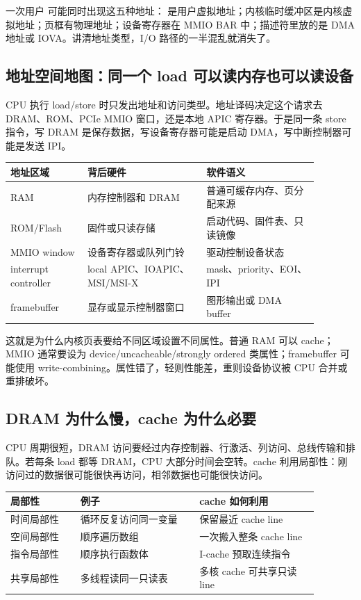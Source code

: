 一次用户  可能同时出现这五种地址： 是用户虚拟地址；内核临时缓冲区是内核虚拟地址；页框有物理地址；设备寄存器在 MMIO BAR 中；描述符里放的是 DMA 地址或 IOVA。讲清地址类型，I/O 路径的一半混乱就消失了。

\subsection{地址空间地图：同一个 load 可以读内存也可以读设备}

CPU 执行 load/store 时只发出地址和访问类型。地址译码决定这个请求去 DRAM、ROM、PCIe MMIO 窗口，还是本地 APIC 寄存器。于是同一条 store 指令，写 DRAM 是保存数据，写设备寄存器可能是启动 DMA，写中断控制器可能是发送 IPI。

\begin{longtable}{p{0.22\linewidth}p{0.34\linewidth}p{0.32\linewidth}}
\toprule
地址区域 & 背后硬件 & 软件语义 \\
\midrule
RAM & 内存控制器和 DRAM & 普通可缓存内存、页分配来源 \\
ROM/Flash & 固件或只读存储 & 启动代码、固件表、只读镜像 \\
MMIO window & 设备寄存器或队列门铃 & 驱动控制设备状态 \\
interrupt controller & local APIC、IOAPIC、MSI/MSI-X & mask、priority、EOI、IPI \\
framebuffer & 显存或显示控制器窗口 & 图形输出或 DMA buffer \\
\bottomrule
\end{longtable}

这就是为什么内核页表要给不同区域设置不同属性。普通 RAM 可以 cache；MMIO 通常要设为 device/uncacheable/strongly ordered 类属性；framebuffer 可能使用 write-combining。属性错了，轻则性能差，重则设备协议被 CPU 合并或重排破坏。

\subsection{DRAM 为什么慢，cache 为什么必要}

CPU 周期很短，DRAM 访问要经过内存控制器、行激活、列访问、总线传输和排队。若每条 load 都等 DRAM，CPU 大部分时间会空转。cache 利用局部性：刚访问过的数据很可能很快再访问，相邻数据也可能很快访问。

\begin{longtable}{p{0.2\linewidth}p{0.34\linewidth}p{0.34\linewidth}}
\toprule
局部性 & 例子 & cache 如何利用 \\
\midrule
时间局部性 & 循环反复访问同一变量 & 保留最近 cache line \\
空间局部性 & 顺序遍历数组 & 一次搬入整条 cache line \\
指令局部性 & 顺序执行函数体 & I-cache 预取连续指令 \\
共享局部性 & 多线程读同一只读表 & 多核 cache 可共享只读 line \\
\bottomrule
\end{longtable}

